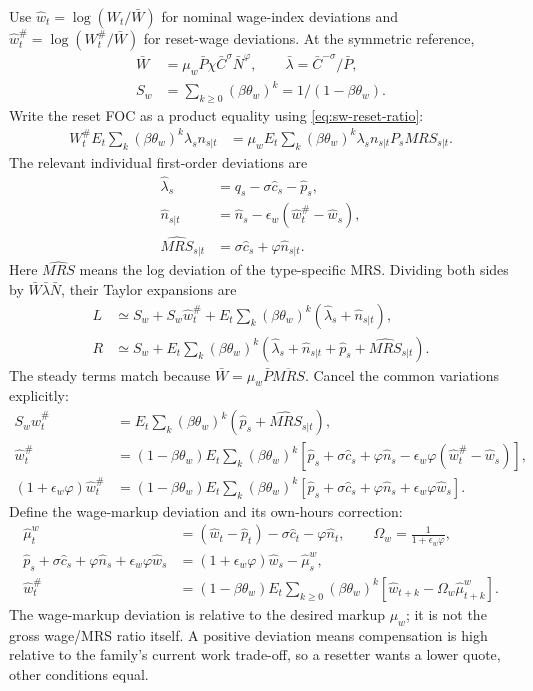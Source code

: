Use $\hat w_t=\log(W_t/\bar W)$ for nominal wage-index deviations and
$\hat w_t^{\#}=\log(W_t^{\#}/\bar W)$ for reset-wage deviations. At the
symmetric reference,
\begin{align}
 \bar W&=\mu_w\bar P\chi\bar C^\sigma\bar N^\varphi,\qquad
 \bar\lambda=\bar C^{-\sigma}/\bar P,\\
 S_w&=\sum_{k\geq0}(\beta\theta_w)^k=1/(1-\beta\theta_w).
\end{align}
Write the reset FOC as a product equality using \eqref{eq:sw-reset-ratio}:
\begin{align}
 W_t^{\#}E_t\sum_k(\beta\theta_w)^k\lambda_sn_{s|t}
 &=\mu_w E_t\sum_k(\beta\theta_w)^k
                         \lambda_sn_{s|t}P_sMRS_{s|t}.
\end{align}
The relevant individual first-order deviations are
\begin{align}
 \hat\lambda_s&=q_s-\sigma\hat c_s-\hat p_s,\\
 \hat n_{s|t}&=\hat n_s-\epsilon_w(\hat w_t^{\#}-\hat w_s),\\
 \hat{MRS}_{s|t}&=\sigma\hat c_s+\varphi\hat n_{s|t}.
\end{align}
Here $\hat{MRS}$ means the log deviation of the type-specific MRS. Dividing
both sides by $\bar W\bar\lambda\bar N$, their Taylor expansions are
\begin{align}
 L&\simeq S_w+S_w\hat w_t^{\#}
       +E_t\sum_k(\beta\theta_w)^k(\hat\lambda_s+\hat n_{s|t}),\\
 R&\simeq S_w+E_t\sum_k(\beta\theta_w)^k
       (\hat\lambda_s+\hat n_{s|t}+\hat p_s+\hat{MRS}_{s|t}).
\end{align}
The steady terms match because $\bar W=\mu_w\bar P\overline{MRS}$.
Cancel the common variations explicitly:
\begin{align}
 S_w\hat w_t^{\#}
 &=E_t\sum_k(\beta\theta_w)^k(\hat p_s+\hat{MRS}_{s|t}),\\
 \hat w_t^{\#}
 &=(1-\beta\theta_w)E_t\sum_k(\beta\theta_w)^k
       [\hat p_s+\sigma\hat c_s+\varphi\hat n_s
                        -\epsilon_w\varphi(\hat w_t^{\#}-\hat w_s)],\\
 (1+\epsilon_w\varphi)\hat w_t^{\#}
 &=(1-\beta\theta_w)E_t\sum_k(\beta\theta_w)^k
       [\hat p_s+\sigma\hat c_s+\varphi\hat n_s+\epsilon_w\varphi\hat w_s].
\end{align}
Define the wage-markup deviation and its own-hours correction:
\begin{align}
 \hat\mu_t^w&=(\hat w_t-\hat p_t)-\sigma\hat c_t-\varphi\hat n_t,
 \qquad\Omega_w=\frac1{1+\epsilon_w\varphi},\\
 \hat p_s+\sigma\hat c_s+\varphi\hat n_s+\epsilon_w\varphi\hat w_s
 &=(1+\epsilon_w\varphi)\hat w_s-\hat\mu_s^w,\\
 \hat w_t^{\#}&=(1-\beta\theta_w)E_t\sum_{k\geq0}(\beta\theta_w)^k
                                  [\hat w_{t+k}-\Omega_w\hat\mu_{t+k}^w].
 \label{eq:sw-reset-linear}
\end{align}
The wage-markup deviation is relative to the desired markup $\mu_w$; it is not
the gross wage/MRS ratio itself. A positive deviation means compensation is
high relative to the family's current work trade-off, so a resetter wants a
lower quote, other conditions equal.

